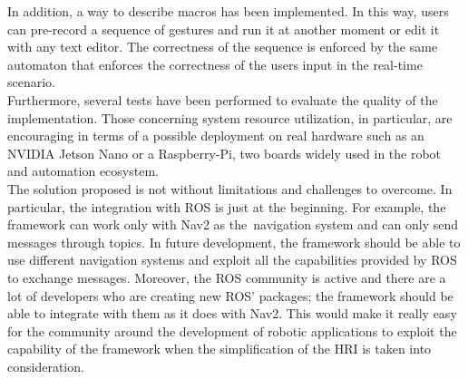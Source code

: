 \documentclass[../thesis.tex]{subfiles}
\begin{document}
In addition, a way to describe macros has been implemented. In this way, users can pre-record a sequence of gestures and run it at another moment or edit it with any text editor. The correctness of the sequence is enforced by the same automaton that enforces the correctness of the users input in the real-time scenario.\\

Furthermore, several tests have been performed to evaluate the quality of the implementation. Those concerning system resource utilization, in particular, are encouraging in terms of a possible deployment on real hardware such as an NVIDIA Jetson Nano or a Raspberry-Pi, two boards widely used in the robot and automation ecosystem.\\

The solution proposed is not without limitations and challenges to overcome. In particular, the integration with \gls{ROS} is just at the beginning. For example, the framework can work only with Nav2 as the navigation system and can only send messages through topics. In future development, the framework should be able to use different navigation systems and exploit all the capabilities provided by \gls{ROS} to exchange messages. Moreover, the \gls{ROS} community is active and there are a lot of developers who are creating new \gls{ROS}' packages; the framework should be able to integrate with them as it does with Nav2. This would make it really easy for the community around the development of robotic applications to exploit the capability of the framework when the simplification of the \gls{HRI} is taken into consideration.
\end{document}
